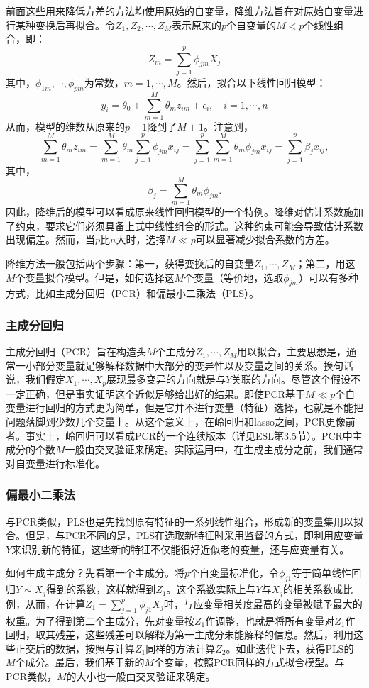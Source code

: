 \documentclass[hyperref,]{ctexart}
\begin{document}
前面这些用来降低方差的方法均使用原始的自变量，降维方法旨在对原始自变量进行某种变换后再拟合。令\(Z_1,Z_2,\cdots,Z_M\)表示原来的\(p\)个自变量的\(M<p\)个线性组合，即：
\[Z_m = \sum_{j=1}^p \phi_{jm}X_j\]
其中，\(\phi_{1m},\cdots,\phi_{pm}\)为常数，\(m=1,\cdots,M\)。然后，拟合以下线性回归模型：
\[y_i=\theta_0+\sum_{m=1}^M \theta_m z_{im} + \epsilon_i,\quad i=1,\cdots,n\]
从而，模型的维数从原来的\(p+1\)降到了\(M+1\)。注意到，
\[\sum_{m=1}^M\theta_m z_{im}=\sum_{m=1}^M\theta_m\sum_{j=1}^p\phi_{jm}x_{ij}
=\sum_{j=1}^p\sum_{m=1}^M\theta_m\phi_{jm}x_{ij}=\sum_{j=1}^p\beta_j x_{ij},\]
其中， \[\beta_j=\sum_{m=1}^M\theta_m \phi_{jm}.\]
因此，降维后的模型可以看成原来线性回归模型的一个特例。降维对估计系数施加了约束，要求它们必须具备上式中线性组合的形式。这种约束可能会导致估计系数出现偏差。然而，当\(p\)比\(n\)大时，选择\(M\ll p\)可以显著减少拟合系数的方差。

降维方法一般包括两个步骤：第一，获得变换后的自变量\(Z_1,\cdots,Z_M\)；第二，用这\(M\)个变量拟合模型。但是，如何选择这\(M\)个变量（等价地，选取\(\phi_{jm}\)）可以有多种方式，比如主成分回归（PCR）和偏最小二乘法（PLS）。

\subsubsection{主成分回归}

主成分回归（PCR）旨在构造头\(M\)个主成分\(Z_1,\cdots,Z_M\)用以拟合，主要思想是，通常一小部分变量就足够解释数据中大部分的变异性以及变量之间的关系。换句话说，我们假定\(X_1,\cdots,X_p\)展现最多变异的方向就是与\(Y\)关联的方向。尽管这个假设不一定正确，但是事实证明这个近似足够给出好的结果。即使PCR基于\(M\ll p\)个自变量进行回归的方式更为简单，但是它并不进行变量（特征）选择，也就是不能把问题落脚到少数几个变量上。从这个意义上，在岭回归和lasso之间，PCR更像前者。事实上，岭回归可以看成PCR的一个连续版本（详见ESL第3.5节）。PCR中主成分的个数\(M\)一般由交叉验证来确定。实际运用中，在生成主成分之前，我们通常对自变量进行标准化。

\subsubsection{偏最小二乘法}

与PCR类似，PLS也是先找到原有特征的一系列线性组合，形成新的变量集用以拟合。但是，与PCR不同的是，PLS在选取新特征时采用监督的方式，即利用应变量\(Y\)来识别新的特征，这些新的特征不仅能很好近似老的变量，还与应变量有关。

如何生成主成分？先看第一个主成分。将\(p\)个自变量标准化，令\(\phi_{j1}\)等于简单线性回归\(Y\sim X_j\)得到的系数，这样就得到\(Z_1\)。这个系数实际上与\(Y\)与\(X_j\)的相关系数成比例，从而，在计算\(Z_1=\sum_{j=1}^p \phi_{j1}X_j\)时，与应变量相关度最高的变量被赋予最大的权重。为了得到第二个主成分，先对变量按\(Z_1\)作调整，也就是将所有变量对\(Z_1\)作回归，取其残差，这些残差可以解释为第一主成分未能解释的信息。然后，利用这些正交后的数据，按照与计算\(Z_1\)同样的方法计算\(Z_2\)。如此迭代下去，获得PLS的\(M\)个成分。最后，我们基于新的\(M\)个变量，按照PCR同样的方式拟合模型。与PCR类似，\(M\)的大小也一般由交叉验证来确定。
\end{document}
